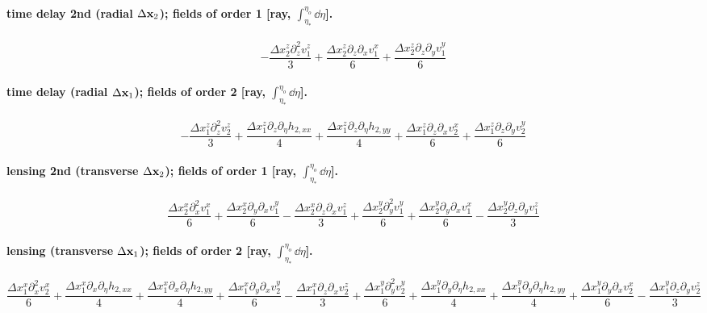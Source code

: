 \paragraph{time delay 2nd (radial $\Delta\mathbf x_2$); fields of order 1 [ray, $\int_{\eta_*}^{\eta_o}\dd\eta$].}
\begin{dmath*}- \frac{{\Delta x^{z}_{2}} \partial_{z}^{2}  {v^{z}_{1}}}{3} + \frac{{\Delta x^{z}_{2}} \partial_{z}\partial_{x}  {v^{x}_{1}}}{6} + \frac{{\Delta x^{z}_{2}} \partial_{z}\partial_{y}  {v^{y}_{1}}}{6}\end{dmath*}
\paragraph{time delay (radial $\Delta\mathbf x_1$); fields of order 2 [ray, $\int_{\eta_*}^{\eta_o}\dd\eta$].}
\begin{dmath*}- \frac{{\Delta x^{z}_{1}} \partial_{z}^{2}  {v^{z}_{2}}}{3} + \frac{{\Delta x^{z}_{1}} \partial_{z}\partial_{\eta}  h_{2,xx}}{4} + \frac{{\Delta x^{z}_{1}} \partial_{z}\partial_{\eta}  h_{2,yy}}{4} + \frac{{\Delta x^{z}_{1}} \partial_{z}\partial_{x}  {v^{x}_{2}}}{6} + \frac{{\Delta x^{z}_{1}} \partial_{z}\partial_{y}  {v^{y}_{2}}}{6}\end{dmath*}
\paragraph{lensing 2nd (transverse $\Delta\mathbf x_2$); fields of order 1 [ray, $\int_{\eta_*}^{\eta_o}\dd\eta$].}
\begin{dmath*}\frac{{\Delta x^{x}_{2}} \partial_{x}^{2}  {v^{x}_{1}}}{6} + \frac{{\Delta x^{x}_{2}} \partial_{y}\partial_{x}  {v^{y}_{1}}}{6} - \frac{{\Delta x^{x}_{2}} \partial_{z}\partial_{x}  {v^{z}_{1}}}{3} + \frac{{\Delta x^{y}_{2}} \partial_{y}^{2}  {v^{y}_{1}}}{6} + \frac{{\Delta x^{y}_{2}} \partial_{y}\partial_{x}  {v^{x}_{1}}}{6} - \frac{{\Delta x^{y}_{2}} \partial_{z}\partial_{y}  {v^{z}_{1}}}{3}\end{dmath*}
\paragraph{lensing (transverse $\Delta\mathbf x_1$); fields of order 2 [ray, $\int_{\eta_*}^{\eta_o}\dd\eta$].}
\begin{dmath*}\frac{{\Delta x^{x}_{1}} \partial_{x}^{2}  {v^{x}_{2}}}{6} + \frac{{\Delta x^{x}_{1}} \partial_{x}\partial_{\eta}  h_{2,xx}}{4} + \frac{{\Delta x^{x}_{1}} \partial_{x}\partial_{\eta}  h_{2,yy}}{4} + \frac{{\Delta x^{x}_{1}} \partial_{y}\partial_{x}  {v^{y}_{2}}}{6} - \frac{{\Delta x^{x}_{1}} \partial_{z}\partial_{x}  {v^{z}_{2}}}{3} + \frac{{\Delta x^{y}_{1}} \partial_{y}^{2}  {v^{y}_{2}}}{6} + \frac{{\Delta x^{y}_{1}} \partial_{y}\partial_{\eta}  h_{2,xx}}{4} + \frac{{\Delta x^{y}_{1}} \partial_{y}\partial_{\eta}  h_{2,yy}}{4} + \frac{{\Delta x^{y}_{1}} \partial_{y}\partial_{x}  {v^{x}_{2}}}{6} - \frac{{\Delta x^{y}_{1}} \partial_{z}\partial_{y}  {v^{z}_{2}}}{3}\end{dmath*}

